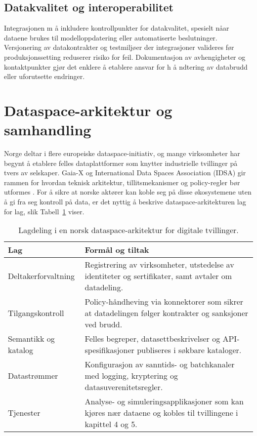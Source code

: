 \subsection{Datakvalitet og interoperabilitet}
Integrasjonen m å inkludere kontrollpunkter for datakvalitet, spesielt nåar dataene brukes til modelloppdatering eller automatiserte beslutninger. Versjonering av datakontrakter og testmiljøer der integrasjoner valideres før produksjonssetting reduserer risiko for feil. Dokumentasjon av avhengigheter og kontaktpunkter gjør det enklere  å etablere ansvar for h å ndtering av databrudd eller uforutsette endringer.

\section{Dataspace-arkitektur og samhandling}
Norge deltar i flere europeiske dataspace-initiativ, og mange virksomheter har begynt å etablere felles dataplattformer som
knytter industrielle tvillinger på tvers av selskaper. Gaia-X og International Data Spaces Association (IDSA) gir rammen for
hvordan teknisk arkitektur, tillitsmekanismer og policy-regler bør utformes \citep{gaiax2023architecture,idsa2023ram}. For å
sikre at norske aktører kan koble seg på disse økosystemene uten å gi fra seg kontroll på data, er det nyttig å beskrive
dataspace-arkitekturen lag for lag, slik Tabell~\ref{tab:kap03-dataspace-lag} viser.

\begin{table}[ht]
    \centering
    \caption{Lagdeling i en norsk dataspace-arkitektur for digitale tvillinger.}
    \label{tab:kap03-dataspace-lag}
    \begin{tabular}{p{}p{}}
        \toprule
        \textbf{Lag} & \textbf{Formål og tiltak} \\
        \midrule
        Deltakerforvaltning & Registrering av virksomheter, utstedelse av identiteter og sertifikater, samt avtaler om datadeling. \\
        Tilgangskontroll & Policy-håndheving via konnektorer som sikrer at datadelingen følger kontrakter og sanksjoner ved brudd. \\
        Semantikk og katalog & Felles begreper, datasettbeskrivelser og API-spesifikasjoner publiseres i søkbare kataloger. \\
        Datastrømmer & Konfigurasjon av sanntids- og batchkanaler med logging, kryptering og datasuverenitetsregler. \\
        Tjenester & Analyse- og simuleringsapplikasjoner som kan kjøres nær dataene og kobles til tvillingene i kapittel 4 og 5. \\
        \bottomrule
    \end{tabular}
\end{table}

